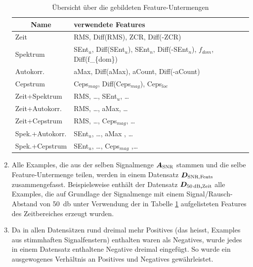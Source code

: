 \begin{enumerate}
\begin{table}[h]
\centering
\caption{Übersicht über die gebildeten Feature-Untermengen}
\label{tab:vad_feat_subsets}
\begin{tabular}{@{}ll@{}}
\toprule
\multicolumn{1}{c}{Name} & verwendete Features                                                              \\ \midrule
Zeit                     & RMS, Diff(RMS), ZCR, Diff(-ZCR)                                                  \\
Spektrum                 & SEnt$_u$, Diff(SEnt$_u$), SEnt$_n$, Diff(-SEnt$_n$), $f_{dom}$, Diff(f\_\{dom\}) \\
Autokorr.                & aMax, Diff(aMax), aCount, Diff(-aCount)                                          \\
Cepstrum                 & Ceps$_{mag}$, Diff(Ceps$_{mag}$), Ceps$_{loc}$                                   \\
Zeit+Spektrum            & RMS, \ldots , SEnt$_u$, \ldots                                                   \\
Zeit+Autokorr.           & RMS, \ldots , aMax, \ldots                                                       \\
Zeit+Cepstrum            & RMS, \ldots , Ceps$_{mag}$, \ldots                                               \\
Spek.+Autokorr.          & SEnt$_u$, \ldots , aMax , \ldots                                                 \\
Spek.+Cepstrum           & SEnt$_u$, \ldots, Ceps$_{mag}$ ,\ldots                                           \\ \bottomrule
\end{tabular}
\end{table}
\item Alle Examples, die aus der selben Signalmenge $\boldmath{A_{\text{SNR}}}$ stammen und die selbe Feature-Untermenge teilen, werden in einem Datensatz $\boldmath{D_{\text{SNR,Feats}}}$ zusammengefasst. Beispielsweise enthält der Datensatz $\boldmath{D_{\SI{50}{\decibel},\text{Zeit}}}$ alle Examples, die auf Grundlage der Signalmenge mit einem Signal/Rausch-Abstand von \SI{50}{\decibel} unter Verwendung der in Tabelle \ref{tab:vad_feat_subsets} aufgelisteten Features des Zeitbereiches erzeugt wurden.
\item Da in allen Datensätzen rund dreimal mehr Positives (das heisst, Examples aus stimmhaften Signalfenstern) enthalten waren als Negatives, wurde jedes in einem Datensatz enthaltene Negative dreimal eingefügt. So wurde ein ausgewogenes Verhältnis an Positives und Negatives gewährleistet.
\end{enumerate}

